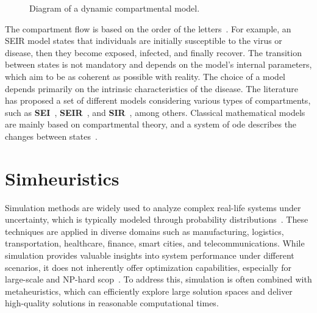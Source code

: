 \begin{figure}[!ht]
{
	
	} \caption{Diagram of a dynamic compartmental model.}
	\label{fig:dynamicmodel}
\end{figure}

The compartment flow is based on the order of the letters~\citep{amaku:2014}.
For example, an SEIR model states that individuals are initially susceptible to
the virus or disease, then they become exposed, infected, and finally recover.
The transition between states is not mandatory and depends on the model's
internal parameters, which aim to be as coherent as possible with reality. The
choice of a model depends primarily on the intrinsic characteristics of the
disease. The literature has proposed a set of different models considering
various types of compartments, such as \textbf{SEI}~\cite{Scoglio2021,
	Puntipa2023}, \textbf{SEIR}~\cite{Scoglio2021, Puntipa2023, Meng2023,
	da-silva:2020}, and \textbf{SIR}~\cite{Umar2022, Prasetyo2023, Srivastav2023},
among others.  Classical mathematical models are mainly based on compartmental
theory, and a system of \gls{ode} describes the changes between
states~\citep{da-silva:2020}.

\section{Simheuristics}\label{sec:simheuristics}

Simulation methods are widely used to analyze complex real-life systems under
uncertainty, which is typically modeled through probability
distributions~\cite{lucas:2015}. These techniques are applied in diverse domains
such as manufacturing, logistics, transportation, healthcare, finance, smart
cities, and telecommunications. While simulation provides valuable insights into
system performance under different scenarios, it does not inherently offer
optimization capabilities, especially for large-scale and NP-hard
\gls{scop}~\cite{juan:2022}. To address this, simulation is often combined with
metaheuristics, which can efficiently explore large solution spaces and deliver
high-quality solutions in reasonable computational times.


